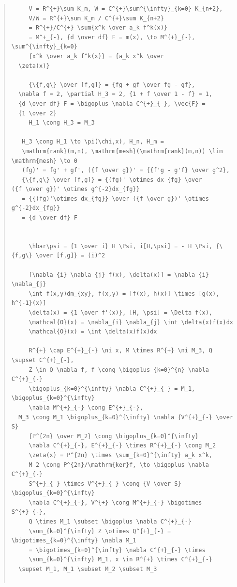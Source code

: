 \documentclass{jsarticle}
\begin{document}
\begin{quote}
\begin{verbatim}
     V = R^{+}\sum K_m, W = C^{+}\sum^{\infty}_{k=0} K_{n+2}, 
     V/W = R^{+}\sum K_m / C^{+}\sum K_{n+2}   
     = R^{+}/C^{+} \sum{x^k \over a_k f^k(x)}   
     = M^+_{-}, {d \over df} F = m(x), \to M^{+}_{-}, \sum^{\infty}_{k=0}
     {x^k \over a_k f^k(x)} = {a_k x^k \over 
  \zeta(x)}   

     {\{f,g\} \over [f,g]} = {fg + gf \over fg - gf}, 
  \nabla f = 2, \partial H_3 = 2, {1 + f \over 1 - f} = 1,
  {d \over df} F = \bigoplus \nabla C^{+}_{-}, \vec{F} =
  {1 \over 2}   
     H_1 \cong H_3 = M_3   

   H_3 \cong H_1 \to \pi(\chi,x), H_n, H_m = 
   \mathrm{rank}(m,n), \mathrm{mesh}(\mathrm{rank}(m,n)) \lim \mathrm{mesh} \to 0   
   (fg)' = fg' + gf', ({f \over g})' = {{f'g - g'f} \over g^2}, 
   {\{f,g\} \over [f,g]} = {(fg)' \otimes dx_{fg} \over 
({f \over g})' \otimes g^{-2}dx_{fg}}   
   = {{(fg)'\otimes dx_{fg}} \over ({f \over g})' \otimes g^{-2}dx_{fg}}   
   = {d \over df} F   


     \hbar\psi = {1 \over i} H \Psi, i[H,\psi] = - H \Psi, {\{f,g\} \over [f,g]} = (i)^2   

     [\nabla_{i} \nabla_{j} f(x), \delta(x)] = \nabla_{i} \nabla_{j} 
     \int f(x,y)dm_{xy}, f(x,y) = [f(x), h(x)] \times [g(x), h^{-1}(x)]   
     \delta(x) = {1 \over f'(x)}, [H, \psi] = \Delta f(x), 
     \mathcal{O}(x) = \nabla_{i} \nabla_{j} \int \delta(x)f(x)dx   
     \mathcal{O}(x) = \int \delta(x)f(x)dx   

     R^{+} \cap E^{+}_{-} \ni x, M \times R^{+} \ni M_3, Q \supset C^{+}_{-}, 
     Z \in Q \nabla f, f \cong \bigoplus_{k=0}^{n} \nabla C^{+}_{-}   
     \bigoplus_{k=0}^{\infty} \nabla C^{+}_{-} = M_1, \bigoplus_{k=0}^{\infty}
     \nabla M^{+}_{-} \cong E^{+}_{-},
  M_3 \cong M_1 \bigoplus_{k=0}^{\infty} \nabla {V^{+}_{-} \over S}   
     {P^{2n} \over M_2} \cong \bigoplus_{k=0}^{\infty} 
     \nabla C^{+}_{-}, E^{+}_{-} \times R^{+}_{-} \cong M_2   
     \zeta(x) = P^{2n} \times \sum_{k=0}^{\infty} a_k x^k, 
     M_2 \cong P^{2n}/\mathrm{ker}f, \to \bigoplus \nabla C^{+}_{-}   
     S^{+}_{-} \times V^{+}_{-} \cong {V \over S} \bigoplus_{k=0}^{\infty}
     \nabla C^{+}_{-}, V^{+} \cong M^{+}_{-} \bigotimes S^{+}_{-}, 
     Q \times M_1 \subset \bigoplus \nabla C^{+}_{-}    
     \sum_{k=0}^{\infty} Z \otimes Q^{+}_{-} = \bigotimes_{k=0}^{\infty} \nabla M_1   
     = \bigotimes_{k=0}^{\infty} \nabla C^{+}_{-} \times 
     \sum_{k=0}^{\infty} M_1, x \in R^{+} \times C^{+}_{-}
  \supset M_1, M_1 \subset M_2 \subset M_3   


\end{verbatim}
\end{quote}
\end{document}

